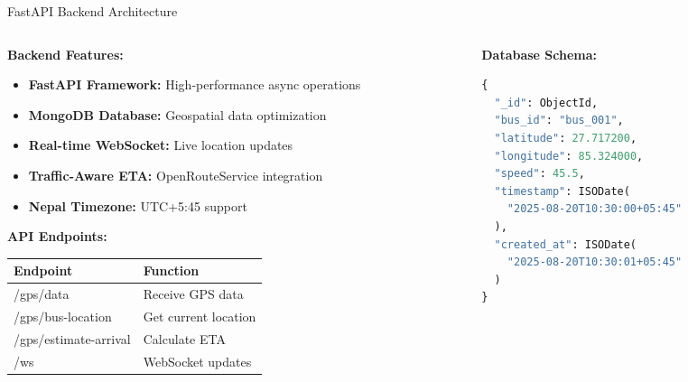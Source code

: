 \documentclass[aspectratio=169]{beamer}
\begin{document}
\begin{frame}{FastAPI Backend Architecture}
    \begin{columns}
        \begin{column}{0.6\textwidth}
            \textbf{Backend Features:}
            \begin{itemize}
                \item \textbf{FastAPI Framework:} High-performance async operations
                \item \textbf{MongoDB Database:} Geospatial data optimization
                \item \textbf{Real-time WebSocket:} Live location updates
                \item \textbf{Traffic-Aware ETA:} OpenRouteService integration
                \item \textbf{Nepal Timezone:} UTC+5:45 support
            \end{itemize}
            
            \vspace{0.3cm}
            \textbf{API Endpoints:}
            \begin{center}
                \tiny
                \begin{tabular}{|l|l|}
                    \hline
                    \textbf{Endpoint} & \textbf{Function} \\
                    \hline
                    /gps/data & Receive GPS data \\
                    /gps/bus-location & Get current location \\
                    /gps/estimate-arrival & Calculate ETA \\
                    /ws & WebSocket updates \\
                    \hline
                \end{tabular}
            \end{center}
        \end{column}
        \begin{column}{0.4\textwidth}
            \textbf{Database Schema:}
            \begin{lstlisting}[language=Python]
{
  "_id": ObjectId,
  "bus_id": "bus_001",
  "latitude": 27.717200,
  "longitude": 85.324000,
  "speed": 45.5,
  "timestamp": ISODate(
    "2025-08-20T10:30:00+05:45"
  ),
  "created_at": ISODate(
    "2025-08-20T10:30:01+05:45"
  )
}
            \end{lstlisting}
        \end{column}
    \end{columns}
\end{frame}
\end{document}

